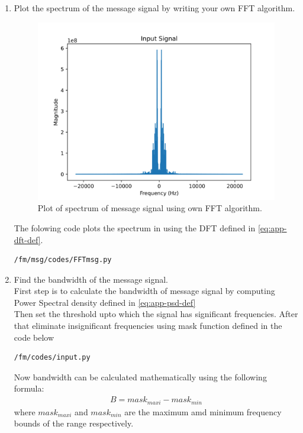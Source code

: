 \begin{enumerate}[label=\arabic*.,ref=\thesection.\theenumi]
\item Plot the spectrum of the message signal by writing your own FFT algorithm.\\
	\solution
\begin{figure}[H]
\centering
\includegraphics[width=\columnwidth]{fm/msg/figs/FFTown/input2.png}
\caption{Plot of spectrum of message signal using own FFT algorithm.}
\label{fig:FFTo}
\end{figure}
The folowing code plots the spectrum in  using the DFT defined in  \eqref{eq:app-dft-def}.
\begin{lstlisting}
/fm/msg/codes/FFTmsg.py
\end{lstlisting}

\item Find the bandwidth of the message signal.\\
\solution First step is to calculate the bandwidth of message signal by computing Power Spectral density defined in \eqref{eq:app-psd-def} \\
Then set the threshold upto which the signal has significant frequencies.
After that eliminate insignificant frequencies using mask function defined in the code below\\
\begin{lstlisting}
/fm/codes/input.py
\end{lstlisting}
Now bandwidth can be calculated mathematically using the following formula:
\begin{align*}
B=mask_{maxi}-mask_{min}
\end{align*}
where $mask_{maxi}$ and $mask_{min} $ are the maximum amd minimum frequency bounds of the range  respectively.\\

\end{enumerate}
